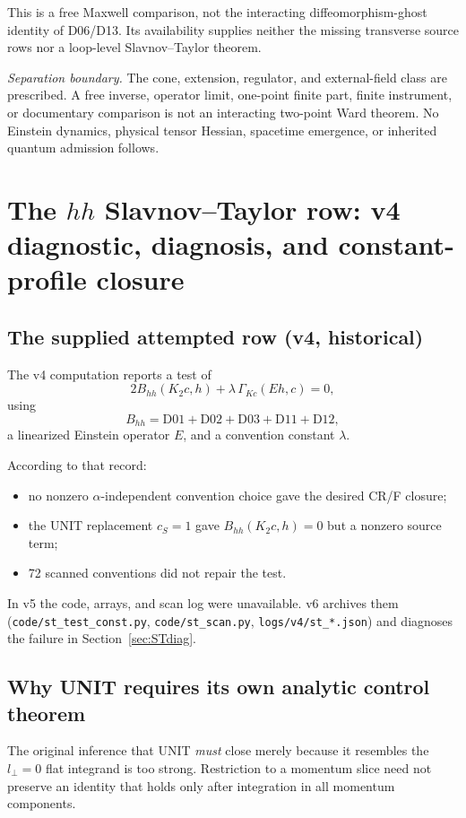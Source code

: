 \documentclass[11pt,a4paper]{article}
\newcommand{\loc}[1]{\nolinkurl{#1}}
\theoremstyle{plain}
\theoremstyle{definition}
\theoremstyle{remark}
\numberwithin{equation}{section}
\newcommand{\separation}{%
\par\smallskip\noindent
\emph{Separation boundary.}
The cone, extension, regulator, and external-field class are prescribed.
A free inverse, operator limit, one-point finite part, finite instrument,
or documentary comparison is not an interacting two-point Ward theorem.
No Einstein dynamics, physical tensor Hessian, spacetime emergence,
or inherited quantum admission follows.
}
\begin{document}
This is a free Maxwell comparison, not the interacting
diffeomorphism-ghost identity of D06/D13.
Its availability supplies neither the missing transverse source
rows nor a loop-level Slavnov--Taylor theorem.
\separation

\section{The \texorpdfstring{\(hh\)}{hh} Slavnov--Taylor row: v4 diagnostic, diagnosis, and constant-profile closure}
\label{sec:ST}

\subsection{The supplied attempted row (v4, historical)}

The v4 computation reports a test of
\begin{equation}
2B_{hh}(K_2c,h)
 +\lambda\,\Gamma_{Kc}(Eh,c)=0,
\label{eq:attemptedST}
\end{equation}
using
\[
B_{hh}=\mathrm{D01+D02+D03+D11+D12},
\]
a linearized Einstein operator \(E\), and a convention constant
\(\lambda\).

According to that record:
\begin{itemize}
\item no nonzero \(\alpha\)-independent convention choice gave
the desired CR/F closure;
\item the UNIT replacement \(c_S=1\) gave
\(B_{hh}(K_2c,h)=0\) but a nonzero source term;
\item 72 scanned conventions did not repair the test.
\end{itemize}
In v5 the code, arrays, and scan log were unavailable.
v6 archives them (\loc{code/st_test_const.py}, \loc{code/st_scan.py},
\loc{logs/v4/st_*.json}) and diagnoses the failure in
Section~\ref{sec:STdiag}.

\subsection{Why UNIT requires its own analytic control theorem}

The original inference that UNIT \emph{must} close merely because
it resembles the \(l_\perp=0\) flat integrand is too strong.
Restriction to a momentum slice need not preserve an identity
that holds only after integration in all momentum components.
\end{document}
